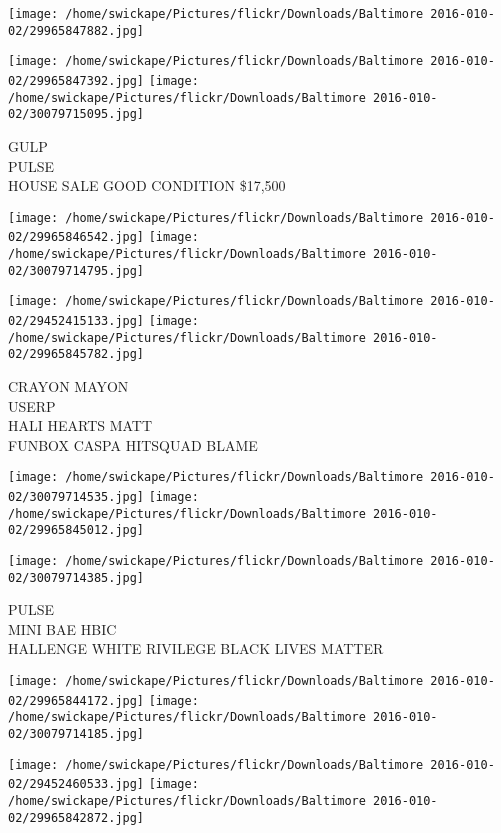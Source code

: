 \documentclass[10pt,letterpaper]{article}
\begin{document}
\texttt{[image: /home/swickape/Pictures/flickr/Downloads/Baltimore 2016-010-02/29965847882.jpg]}

\vspace{0.25in}
\texttt{[image: /home/swickape/Pictures/flickr/Downloads/Baltimore 2016-010-02/29965847392.jpg]}
\texttt{[image: /home/swickape/Pictures/flickr/Downloads/Baltimore 2016-010-02/30079715095.jpg]}

GULP\\
PULSE\\
HOUSE SALE GOOD CONDITION \$17,500\\
\pagebreak

\texttt{[image: /home/swickape/Pictures/flickr/Downloads/Baltimore 2016-010-02/29965846542.jpg]}
\texttt{[image: /home/swickape/Pictures/flickr/Downloads/Baltimore 2016-010-02/30079714795.jpg]}

\texttt{[image: /home/swickape/Pictures/flickr/Downloads/Baltimore 2016-010-02/29452415133.jpg]}
\texttt{[image: /home/swickape/Pictures/flickr/Downloads/Baltimore 2016-010-02/29965845782.jpg]}

CRAYON MAYON\\
USERP\\
HALI HEARTS MATT\\
FUNBOX CASPA HITSQUAD BLAME\\
\pagebreak

\texttt{[image: /home/swickape/Pictures/flickr/Downloads/Baltimore 2016-010-02/30079714535.jpg]}
\texttt{[image: /home/swickape/Pictures/flickr/Downloads/Baltimore 2016-010-02/29965845012.jpg]}

\vspace{0.25in}
\texttt{[image: /home/swickape/Pictures/flickr/Downloads/Baltimore 2016-010-02/30079714385.jpg]}

PULSE\\
MINI BAE HBIC\\
HALLENGE WHITE RIVILEGE BLACK LIVES MATTER\\
\pagebreak

\texttt{[image: /home/swickape/Pictures/flickr/Downloads/Baltimore 2016-010-02/29965844172.jpg]}
\texttt{[image: /home/swickape/Pictures/flickr/Downloads/Baltimore 2016-010-02/30079714185.jpg]}

\texttt{[image: /home/swickape/Pictures/flickr/Downloads/Baltimore 2016-010-02/29452460533.jpg]}
\texttt{[image: /home/swickape/Pictures/flickr/Downloads/Baltimore 2016-010-02/29965842872.jpg]}
\end{document}
